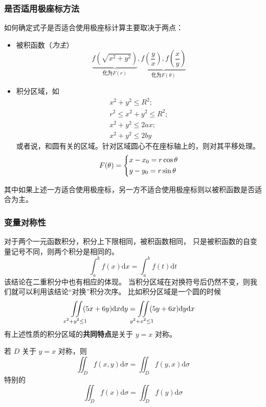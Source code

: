 \subsubsection{是否适用极座标方法}

如何确定式子是否适合使用极座标计算主要取决于两点：
\begin{itemize}
    \item 被积函数（\emph{为主}）
        \[
            \underbrace{f(\sqrt{x^2 + y^2})}_{\mbox{化为} F(r)}, 
            \underbrace{f(\frac{y}{x}), f(\frac{x}{y})}_{\mbox{化为} F(\theta)}
        \]
    \item 积分区域，如
        \begin{gather*}
            x^2 + y^2 \leq R^2;\\ 
            r^2 \leq x^2 + y^2 \leq R^2;\\
            x^2 + y^2 \leq 2ax;\\
            x^2 + y^2 \leq 2by
        \end{gather*}
        或者说，和圆有关的区域。针对区域圆心不在座标轴上的，则对其平移处理。
        \[
            F(\theta) = \begin{dcases*}
                x - x_0 = r \cos \theta \\
                y - y_0 = r \sin \theta
            \end{dcases*}
        \]
\end{itemize}
其中如果上述一方适合使用极座标，另一方不适合使用极座标则以被积函数是否适合为主。

\subsubsection{变量对称性}
\label{multivariable-integral-properity-of-variable-symtric}

对于两个一元函数积分，积分上下限相同，被积函数相同，
只是被积函数的自变量记号不同，则两个积分是相同的。
\[
    \int_a^b f(x) \mathrm dx = \int_a^b f(t) \mathrm dt
\]
该结论在二重积分中也有相应的体现。
当积分区域在对换符号后仍然不变，则我们就可以利用该结论“对换”积分次序。
比如积分区域是一个圆的时候
\[
    \iint\limits_{\mathclap{\substack{x^2 + y^2 \leq 1}}} (5x + 6y) \mathrm dx \mathrm dy = 
    \iint\limits_{\mathclap{\substack{y^2 + x^2 \leq 1}}} (5y + 6x) \mathrm dy \mathrm dx 
\]
有上述性质的积分区域的\textbf{共同特点}是关于 $y = x$ 对称。
 
\begin{theorem}
    若 $D$ 关于 $y = x$ 对称，则
    \[
        \iint_D f(x, y) \mathrm d\sigma = \iint_D f(y, x) \mathrm d\sigma
    \]
    特别的
    \[
        \iint_D f(x) \mathrm d\sigma = \iint_D f(y) \mathrm d\sigma
    \]
\end{theorem}

